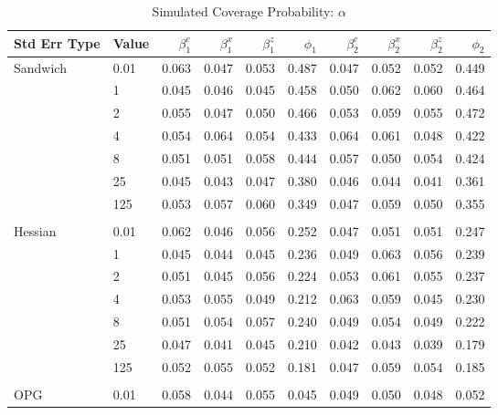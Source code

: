 \documentclass[12pt]{article}
\theoremstyle{definition}
\begin{document}
\begin{table}[b!] \centering
  \caption{Simulated Coverage Probability: $\alpha$}
  \begin{threeparttable}
    {\footnotesize
    \begin{tabular}[r]{l l r r r r r r r r}
  \hline
Std Err Type & Value & $\beta_{1}^{c}$ & $\beta_{1}^{x}$ & $\beta_{1}^{z}$ & $\phi_{1}$ & $\beta_{2}^{c}$ & $\beta_{2}^{x}$ & $\beta_{2}^{z}$ & $\phi_{2}$ \\ 
  \hline

Sandwich  & 0.01 & 0.063 & 0.047 & 0.053 & 0.487 & 0.047 & 0.052 & 0.052 & 0.449 \\
          &    1 & 0.045 & 0.046 & 0.045 & 0.458 & 0.050 & 0.062 & 0.060 & 0.464 \\
          &    2 & 0.055 & 0.047 & 0.050 & 0.466 & 0.053 & 0.059 & 0.055 & 0.472 \\
          &    4 & 0.054 & 0.064 & 0.054 & 0.433 & 0.064 & 0.061 & 0.048 & 0.422 \\
          &    8 & 0.051 & 0.051 & 0.058 & 0.444 & 0.057 & 0.050 & 0.054 & 0.424 \\
          &   25 & 0.045 & 0.043 & 0.047 & 0.380 & 0.046 & 0.044 & 0.041 & 0.361 \\
          &  125 & 0.053 & 0.057 & 0.060 & 0.349 & 0.047 & 0.059 & 0.050 & 0.355 \\
          &      &       &       &       &       &       &       &       &       \\
Hessian   & 0.01 & 0.062 & 0.046 & 0.056 & 0.252 & 0.047 & 0.051 & 0.051 & 0.247 \\
          &    1 & 0.045 & 0.044 & 0.045 & 0.236 & 0.049 & 0.063 & 0.056 & 0.239 \\
          &    2 & 0.051 & 0.045 & 0.056 & 0.224 & 0.053 & 0.061 & 0.055 & 0.237 \\
          &    4 & 0.053 & 0.055 & 0.049 & 0.212 & 0.063 & 0.059 & 0.045 & 0.230 \\
          &    8 & 0.051 & 0.054 & 0.057 & 0.240 & 0.049 & 0.054 & 0.049 & 0.222 \\
          &   25 & 0.047 & 0.041 & 0.045 & 0.210 & 0.042 & 0.043 & 0.039 & 0.179 \\
          &  125 & 0.052 & 0.055 & 0.052 & 0.181 & 0.047 & 0.059 & 0.054 & 0.185 \\
          &      &       &       &       &       &       &       &       &       \\
OPG       & 0.01 & 0.058 & 0.044 & 0.055 & 0.045 & 0.049 & 0.050 & 0.048 & 0.052 \\

\end{tabular}}
\end{threeparttable}
\end{table}
\end{document}
